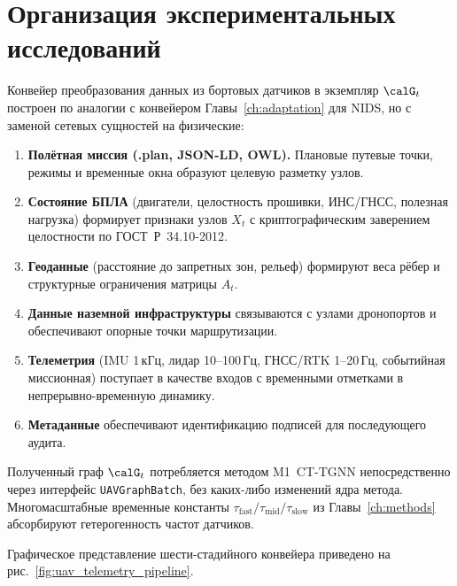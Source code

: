 \section{Организация экспериментальных исследований}
\label{sec:uav_pipeline}

Конвейер преобразования данных из бортовых датчиков в экземпляр
$\calG_t$ построен по аналогии с конвейером Главы~\ref{ch:adaptation}
для NIDS, но с заменой сетевых сущностей на физические:

\begin{enumerate}\setlength\itemsep{0.15em}
\item \textbf{Полётная миссия (.plan, JSON-LD, OWL).} Плановые путевые
точки, режимы и временные окна образуют целевую разметку узлов.
\item \textbf{Состояние БПЛА} (двигатели, целостность прошивки,
ИНС/ГНСС, полезная нагрузка) формирует признаки узлов $X_t$ с
криптографическим заверением целостности по \mbox{ГОСТ~Р~34.10-2012}.
\item \textbf{Геоданные} (расстояние до запретных зон, рельеф)
формируют веса рёбер и структурные ограничения матрицы $A_t$.
\item \textbf{Данные наземной инфраструктуры} связываются с узлами
дронопортов и обеспечивают опорные точки маршрутизации.
\item \textbf{Телеметрия} (IMU 1\,кГц, лидар 10--100\,Гц, ГНСС/RTK
1--20\,Гц, событийная миссионная) поступает в качестве входов с
временными отметками в непрерывно-временную динамику.
\item \textbf{Метаданные} обеспечивают идентификацию подписей для
последующего аудита.
\end{enumerate}

Полученный граф $\calG_t$ потребляется методом \textsf{M1~CT-TGNN}
непосредственно через интерфейс \texttt{UAVGraphBatch}, без
каких-либо изменений ядра метода. Многомасштабные временные константы
$\tau_{\mathrm{fast}}/\tau_{\mathrm{mid}}/\tau_{\mathrm{slow}}$ из
Главы~\ref{ch:methods} абсорбируют гетерогенность частот датчиков.

Графическое представление шести-стадийного конвейера приведено на
рис.~\ref{fig:uav_telemetry_pipeline}.


